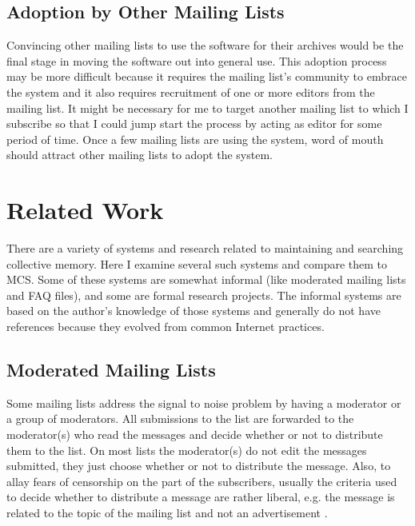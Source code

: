 \section{Adoption by Other Mailing Lists}
Convincing other mailing lists to use the software for their archives would be
the final stage in moving the software out into general use. This adoption
process may be more difficult because it requires the mailing list's community
to embrace the system and it also requires recruitment of one or more editors
from the mailing list. It might be necessary for me to target another mailing
list to which I subscribe so that I could jump start the process by acting as
editor for some period of time. Once a few mailing lists are using the system,
word of mouth should attract other mailing lists to adopt the system.


\chapter{Related Work}
There are a variety of systems and research related to maintaining and
searching collective memory. Here I examine several such systems and compare
them to MCS. Some of these systems are somewhat informal (like moderated
mailing lists and FAQ files), and some are formal research projects. The
informal systems are based on the author's knowledge of those systems and
generally do not have references because they evolved from common Internet
practices.

\section{Moderated Mailing Lists}

Some mailing lists address the signal to noise problem by having a moderator or
a group of moderators. All submissions to the list are forwarded to the
moderator(s) who read the messages and decide whether or not to distribute them
to the list. On most lists the moderator(s) do not edit the messages submitted,
they just choose whether or not to distribute the message. Also, to allay fears
of censorship on the part of the subscribers, usually the criteria used to
decide whether to distribute a message are rather liberal, e.g. the message is
related to the topic of the mailing list and not an advertisement
\cite{pedersen2-96}.

